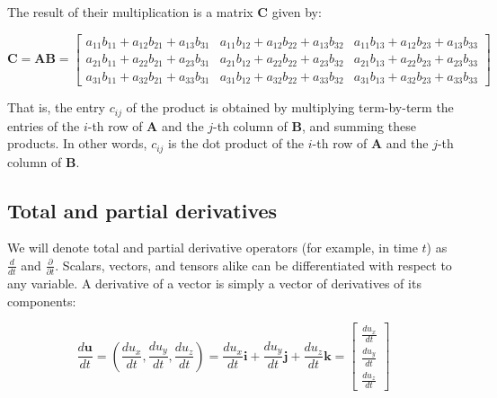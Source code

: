 \documentclass[12pt]{article}
\numberwithin{equation}{section}
\numberwithin{figure}{section}
\numberwithin{table}{section}
\begin{document}
The result of their multiplication is a matrix $\mathbf{C}$ given by:

\begin{equation}
  \mathbf{C} = \mathbf{A} \mathbf{B} =
  \begin{bmatrix}
    a_{11} b_{11} + a_{12} b_{21} + a_{13} b_{31} &
    a_{11} b_{12} + a_{12} b_{22} + a_{13} b_{32} &
    a_{11} b_{13} + a_{12} b_{23} + a_{13} b_{33} \\
    a_{21} b_{11} + a_{22} b_{21} + a_{23} b_{31} &
    a_{21} b_{12} + a_{22} b_{22} + a_{23} b_{32} &
    a_{21} b_{13} + a_{22} b_{23} + a_{23} b_{33} \\
    a_{31} b_{11} + a_{32} b_{21} + a_{33} b_{31} &
    a_{31} b_{12} + a_{32} b_{22} + a_{33} b_{32} &
    a_{31} b_{13} + a_{32} b_{23} + a_{33} b_{33}
  \end{bmatrix}
\end{equation}

That is, the entry $c_{ij}$ of the product is obtained by multiplying
term-by-term the entries of the $i$-th row of $\mathbf{A}$ and the $j$-th column
of $\mathbf{B}$, and summing these products.
In other words, $c_{ij}$ is the dot product of the $i$-th row of $\mathbf{A}$
and the $j$-th column of $\mathbf{B}$.

\subsection{Total and partial derivatives}

We will denote total and partial
derivative operators (for example, in time $t$)
as $\frac{d}{dt}$ and $\frac{\partial}{\partial t}$.
Scalars, vectors, and tensors alike can be differentiated with respect to any
variable.
A derivative of a vector is simply a vector of derivatives of its components:

\begin{equation}
  \frac{d\mathbf{u}}{dt}
    = (\frac{d u_x}{d t}, \frac{d u_y}{d t}, \frac{d u_z}{d t})
    = \frac{du_x}{dt} \mathbf{i} + \frac{du_y}{dt} \mathbf{j} + \frac{du_z}{dt} \mathbf{k}
    = \begin{bmatrix}
        \frac{du_x}{dt} \\
        \frac{du_y}{dt} \\
        \frac{du_z}{dt}
      \end{bmatrix}
\end{equation}
\end{document}
